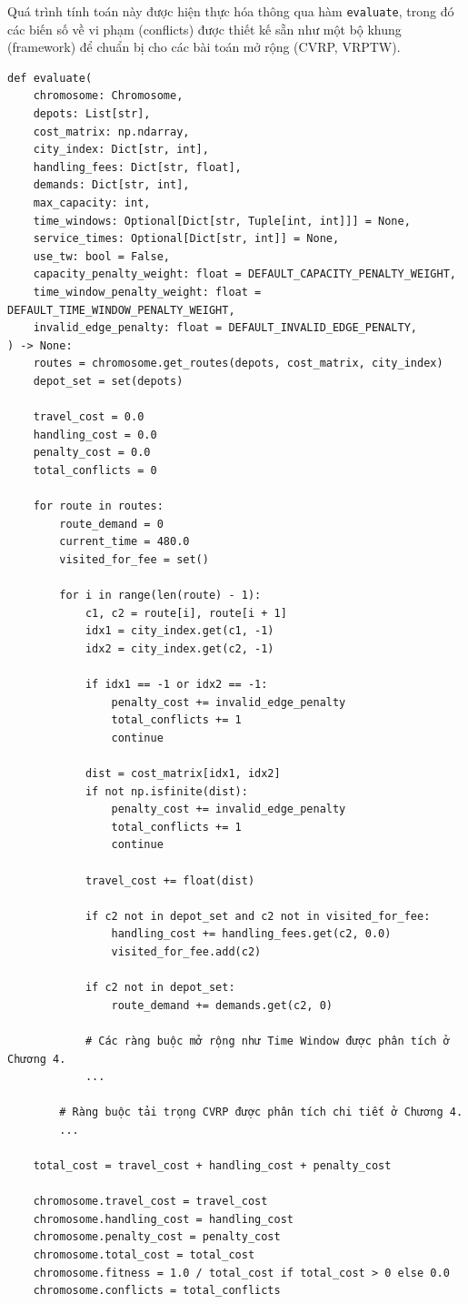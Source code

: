 \documentclass[12pt,a4paper]{article}
\numberwithin{figure}{subsection}
\begin{document}
Quá trình tính toán này được hiện thực hóa thông qua hàm \texttt{evaluate}, trong đó các biến số về vi phạm (conflicts) được thiết kế sẵn như một bộ khung (framework) để chuẩn bị cho các bài toán mở rộng (CVRP, VRPTW).
\begin{verbatim}
def evaluate(
    chromosome: Chromosome,
    depots: List[str],
    cost_matrix: np.ndarray,
    city_index: Dict[str, int],
    handling_fees: Dict[str, float],
    demands: Dict[str, int],
    max_capacity: int,
    time_windows: Optional[Dict[str, Tuple[int, int]]] = None,
    service_times: Optional[Dict[str, int]] = None,
    use_tw: bool = False,
    capacity_penalty_weight: float = DEFAULT_CAPACITY_PENALTY_WEIGHT,
    time_window_penalty_weight: float = DEFAULT_TIME_WINDOW_PENALTY_WEIGHT,
    invalid_edge_penalty: float = DEFAULT_INVALID_EDGE_PENALTY,
) -> None:
    routes = chromosome.get_routes(depots, cost_matrix, city_index)
    depot_set = set(depots)

    travel_cost = 0.0
    handling_cost = 0.0
    penalty_cost = 0.0
    total_conflicts = 0

    for route in routes:
        route_demand = 0
        current_time = 480.0
        visited_for_fee = set()

        for i in range(len(route) - 1):
            c1, c2 = route[i], route[i + 1]
            idx1 = city_index.get(c1, -1)
            idx2 = city_index.get(c2, -1)

            if idx1 == -1 or idx2 == -1:
                penalty_cost += invalid_edge_penalty
                total_conflicts += 1
                continue

            dist = cost_matrix[idx1, idx2]
            if not np.isfinite(dist):
                penalty_cost += invalid_edge_penalty
                total_conflicts += 1
                continue

            travel_cost += float(dist)

            if c2 not in depot_set and c2 not in visited_for_fee:
                handling_cost += handling_fees.get(c2, 0.0)
                visited_for_fee.add(c2)

            if c2 not in depot_set:
                route_demand += demands.get(c2, 0)

            # Các ràng buộc mở rộng như Time Window được phân tích ở Chương 4.
            ...

        # Ràng buộc tải trọng CVRP được phân tích chi tiết ở Chương 4.
        ...

    total_cost = travel_cost + handling_cost + penalty_cost

    chromosome.travel_cost = travel_cost
    chromosome.handling_cost = handling_cost
    chromosome.penalty_cost = penalty_cost
    chromosome.total_cost = total_cost
    chromosome.fitness = 1.0 / total_cost if total_cost > 0 else 0.0
    chromosome.conflicts = total_conflicts
\end{verbatim}
\end{document}
